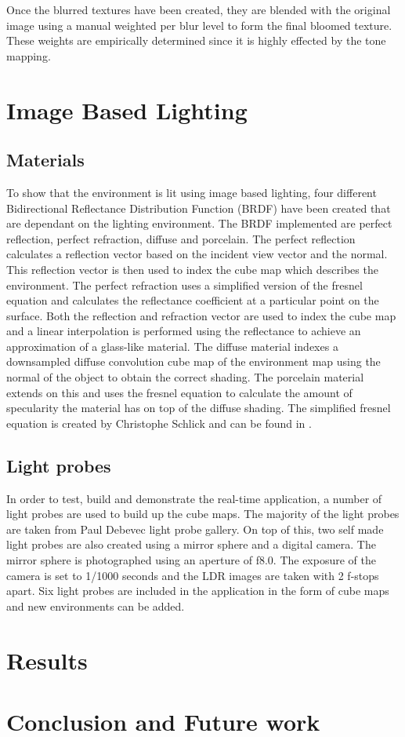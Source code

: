 \documentclass[twocolumn,8pt]{article}
\begin{document}
Once the blurred textures have been created, they are blended with the original image using a manual weighted per blur level to form the final bloomed texture. These weights are empirically determined since it is highly effected by the tone mapping. 

\section{Image Based Lighting}

\subsection{Materials}
To show that the environment is lit using image based lighting, four different Bidirectional Reflectance Distribution Function (BRDF) have been created that are dependant on the lighting environment. The BRDF implemented are perfect reflection, perfect refraction, diffuse and porcelain. The perfect reflection calculates a reflection vector based on the incident view vector and the normal. This reflection vector is then used to index the cube map which describes the environment. The perfect refraction uses a simplified version of the fresnel equation and calculates the reflectance coefficient at a particular point on the surface. Both the reflection and refraction vector are used to index the cube map and a linear interpolation is performed using the reflectance to achieve an approximation of a glass-like material. The diffuse material indexes a downsampled diffuse convolution cube map of the environment map using the normal of the object to obtain the correct shading. The porcelain material extends on this and uses the fresnel equation to calculate the amount of specularity the material has on top of the diffuse shading. The simplified fresnel equation is created by Christophe Schlick and can be found in \cite{opengl-orange-book}.

\subsection{Light probes}
In order to test, build and demonstrate the real-time application, a number of light probes are used to build up the cube maps. The majority of the light probes are taken from Paul Debevec light probe gallery. On top of this, two self made light probes are also created using a mirror sphere and a digital camera. The mirror sphere is photographed using an aperture of f8.0. The exposure of the camera is set to 1/1000 seconds and the LDR images are taken with 2 f-stops apart. Six light probes are included in the application in the form of cube maps and new environments can be added.

\section{Results}

\section{Conclusion and Future work}


{}
	
\end{document}
